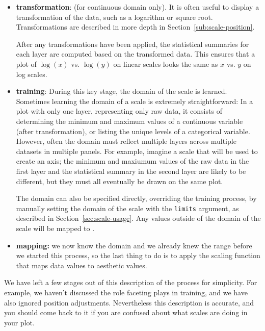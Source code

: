 \begin{itemize}

  \item {\bf transformation}: (for continuous domain only). It is often useful to display a transformation of the data, such as a logarithm or square root. Transformations are described in more depth in Section~\ref{sub:scale-position}.

  After any transformations have been applied, the statistical summaries for each layer are computed based on the transformed data. This ensures that a plot of $\log(x)$ vs. $\log(y)$ on linear scales looks the same as $x$ vs. $y$ on log scales.

  \item {\bf training}:  During this key stage, the domain of the scale is learned.  Sometimes learning the domain of a scale is extremely straightforward: In a plot with only one layer, representing only raw data, it consists of determining the minimum and maximum values of a continuous variable (after transformation), or listing the unique levels of a categorical variable.  However, often the domain must reflect multiple layers across multiple datasets in multiple panels.  For example, imagine a scale that will be used to create an axis; the minimum and maxiumum values of the raw data in the first layer and the statistical summary in the second layer are likely to be different, but they must all eventually be drawn on the same plot.

  The domain can also be specified directly, overriding the training process, by manually setting the domain of the scale with the {\tt limits} argument, as described in Section~\ref{sec:scale-usage}.  Any values outside of the domain of the scale will be mapped to .

  \item {\bf mapping:}  we now know the domain and we already knew the range before we started this process, so the last thing to do is to apply the scaling function that maps data values to aesthetic values. 

\end{itemize}

We have left a few stages out of this description of the process for simplicity.  For example, we haven't discussed the role faceting plays in training, and we have also ignored position adjustments.  Nevertheless this description is accurate, and you should come back to it if you are confused about what scales are doing in your plot.

